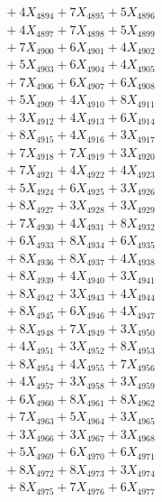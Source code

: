 \documentclass[a4paper,10pt]{article}
\begin{document}
{\begin{align}
&\;  + 4 X_{4894} + 7 X_{4895} + 5 X_{4896} \\[0.3ex]
&\;  + 4 X_{4897} + 7 X_{4898} + 5 X_{4899} \\[0.5ex]\allowbreak
&\;  + 7 X_{4900} + 6 X_{4901} + 4 X_{4902} \\[0.3ex]
&\;  + 5 X_{4903} + 6 X_{4904} + 4 X_{4905} \\[0.3ex]
&\;  + 7 X_{4906} + 6 X_{4907} + 6 X_{4908} \\[0.3ex]
&\;  + 5 X_{4909} + 4 X_{4910} + 8 X_{4911} \\[0.3ex]
&\;  + 3 X_{4912} + 4 X_{4913} + 6 X_{4914} \\[0.3ex]
&\;  + 8 X_{4915} + 4 X_{4916} + 3 X_{4917} \\[0.3ex]
&\;  + 7 X_{4918} + 7 X_{4919} + 3 X_{4920} \\[0.3ex]
&\;  + 7 X_{4921} + 4 X_{4922} + 4 X_{4923} \\[0.3ex]
&\;  + 5 X_{4924} + 6 X_{4925} + 3 X_{4926} \\[0.3ex]
&\;  + 8 X_{4927} + 3 X_{4928} + 3 X_{4929} \\[0.5ex]\allowbreak
&\;  + 7 X_{4930} + 4 X_{4931} + 8 X_{4932} \\[0.3ex]
&\;  + 6 X_{4933} + 8 X_{4934} + 6 X_{4935} \\[0.3ex]
&\;  + 8 X_{4936} + 8 X_{4937} + 4 X_{4938} \\[0.3ex]
&\;  + 8 X_{4939} + 4 X_{4940} + 3 X_{4941} \\[0.3ex]
&\;  + 8 X_{4942} + 3 X_{4943} + 4 X_{4944} \\[0.3ex]
&\;  + 8 X_{4945} + 6 X_{4946} + 4 X_{4947} \\[0.3ex]
&\;  + 8 X_{4948} + 7 X_{4949} + 3 X_{4950} \\[0.3ex]
&\;  + 4 X_{4951} + 3 X_{4952} + 8 X_{4953} \\[0.3ex]
&\;  + 8 X_{4954} + 4 X_{4955} + 7 X_{4956} \\[0.3ex]
&\;  + 4 X_{4957} + 3 X_{4958} + 3 X_{4959} \\[0.5ex]\allowbreak
&\;  + 6 X_{4960} + 8 X_{4961} + 8 X_{4962} \\[0.3ex]
&\;  + 7 X_{4963} + 5 X_{4964} + 3 X_{4965} \\[0.3ex]
&\;  + 3 X_{4966} + 3 X_{4967} + 3 X_{4968} \\[0.3ex]
&\;  + 5 X_{4969} + 6 X_{4970} + 6 X_{4971} \\[0.3ex]
&\;  + 8 X_{4972} + 8 X_{4973} + 3 X_{4974} \\[0.3ex]
&\;  + 8 X_{4975} + 7 X_{4976} + 6 X_{4977} \\[0.3ex]

\end{align}}
\end{document}
